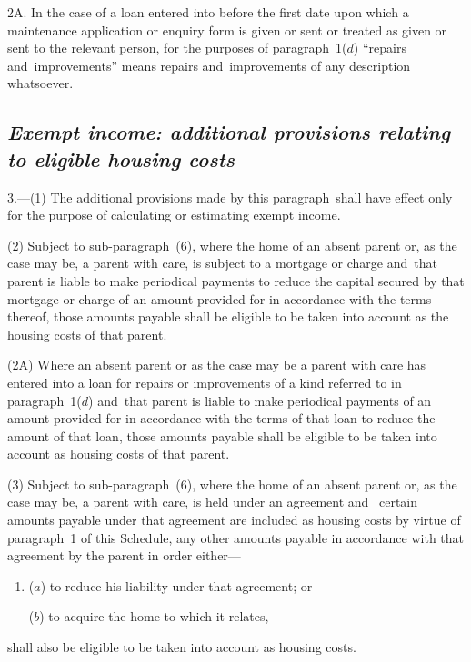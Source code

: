 \documentclass[12pt,a4paper]{article}
\begin{document}
2A.  In the case of a loan entered into before the first date upon which a maintenance application or enquiry form is given or sent or treated as given or sent to the relevant person, for the purposes of paragraph~1($d$) “repairs and~improvements” means repairs and~improvements of any description whatsoever.


\subsection*{\sloppy\itshape Exempt income: additional provisions relating to eligible housing costs}

3.—(1) The additional provisions made by this paragraph~shall have effect only for the purpose of calculating or estimating exempt income.

(2) Subject to sub-paragraph~(6), where the home of an absent parent or, as the case may be, a parent with care, is subject to a mortgage or charge and~that parent 
is liable to make periodical payments  %
to reduce the capital secured by that mortgage or charge of an amount provided for in accordance with the terms thereof, 
those amounts payable  %
shall be eligible to be taken into account as the housing costs of that parent.

(2A) Where an absent parent or as the case may be a parent with care has entered into a loan for repairs or improvements of a kind referred to in paragraph~1($d$) and~that parent 
is liable to make periodical payments  %
of an amount provided for in accordance with the terms of that loan to reduce the amount of that loan, 
those amounts payable  %
shall be eligible to be taken into account as housing costs of that parent.

(3) Subject to sub-paragraph~(6), where the home of an absent parent or, as the case may be, a parent with care, is held under an agreement and~
certain amounts payable  %
under that agreement are included as housing costs by virtue of paragraph~1 of this Schedule, 
any other amounts payable  %
in accordance with that agreement by the parent in order either—
\begin{enumerate}\item[]
($a$) to reduce his liability under that agreement; or

($b$) to acquire the home to which it relates,
\end{enumerate}
shall also be eligible to be taken into account as housing costs.
\end{document}
